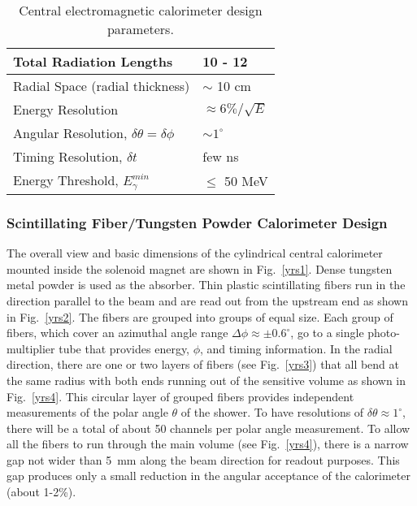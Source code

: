 \begin{table}
\begin{center}
\begin{tabular}{||l|l||}  \hline\hline
Total Radiation Lengths            & 10 - 12 \\ \hline 
Radial Space (radial thickness)    & $\sim$ 10 cm \\ \hline
Energy Resolution                  & $\approx 6\%/\sqrt{E}$  \\ \hline
Angular Resolution, $\delta \theta = \delta \phi$ & $\sim 1^\circ$ \\ \hline
Timing Resolution, $\delta t$      & few ns \\ \hline
Energy Threshold, $E^{min}_\gamma$ & $\leq$ 50 MeV \\ \hline\hline 
\end{tabular}
\caption{\small{Central electromagnetic calorimeter design parameters.}}
\label{parameters}
\end{center}
\end{table}

\subsubsection{Scintillating Fiber/Tungsten Powder Calorimeter Design}

The overall view and basic dimensions of the cylindrical central calorimeter 
mounted inside the solenoid magnet are shown in Fig.~\ref{yrs1}.  Dense 
tungsten metal powder is used as the absorber.  Thin plastic scintillating 
fibers run in the direction parallel to the beam and are read out from the 
upstream end as shown in Fig.~\ref{yrs2}.  The fibers are grouped into 
groups of equal size.  Each group of fibers, which cover an azimuthal angle 
range $\Delta \phi \approx \pm 0.6^\circ$, go to a single photo-multiplier 
tube that provides energy, $\phi$, and timing information.  In the radial 
direction, there are one or two layers of fibers (see Fig.~\ref{yrs3}) that
all bend at the same radius with both ends running out of the sensitive volume 
as shown in Fig.~\ref{yrs4}. This circular layer of grouped fibers provides 
independent measurements of the polar angle $\theta$ of the shower. To have 
resolutions of $\delta \theta \approx 1^\circ$, there will be a total of 
about 50 channels per polar angle measurement.  To allow all the fibers to 
run through the main volume (see Fig.~\ref{yrs4}), there is a narrow gap 
not wider than 5~mm along the beam direction for readout purposes.  This gap 
produces only a small reduction in the angular acceptance of the calorimeter 
(about 1-2\%). 

